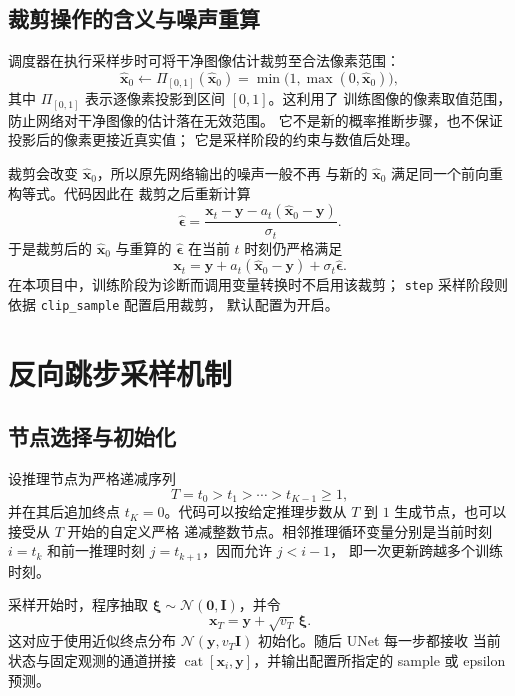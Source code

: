 \documentclass[UTF8,a4paper,12pt]{ctexart}
\begin{document}
\subsection{裁剪操作的含义与噪声重算}

调度器在执行采样步时可将干净图像估计裁剪至合法像素范围：
\[
  \widehat{\bm{x}}_0
  \leftarrow
  \Pi_{[0,1]}(\widehat{\bm{x}}_0)
  =
  \min\!\bigl(1,\max(0,\widehat{\bm{x}}_0)\bigr),
\]
其中 \(\Pi_{[0,1]}\) 表示逐像素投影到区间 \([0,1]\)。这利用了
训练图像的像素取值范围，防止网络对干净图像的估计落在无效范围。
它不是新的概率推断步骤，也不保证投影后的像素更接近真实值；
它是采样阶段的约束与数值后处理。

裁剪会改变 \(\widehat{\bm{x}}_0\)，所以原先网络输出的噪声一般不再
与新的 \(\widehat{\bm{x}}_0\) 满足同一个前向重构等式。代码因此在
裁剪之后重新计算
\[
  \widehat{\bm{\epsilon}}
  =
  \frac{
    \bm{x}_t-\bm{y}
    -a_t(\widehat{\bm{x}}_0-\bm{y})
  }{\sigma_t}.
\]
于是裁剪后的 \(\widehat{\bm{x}}_0\) 与重算的
\(\widehat{\bm{\epsilon}}\) 在当前 \(t\) 时刻仍严格满足
\[
  \bm{x}_t
  =\bm{y}
    +a_t(\widehat{\bm{x}}_0-\bm{y})
    +\sigma_t\widehat{\bm{\epsilon}}.
\]
在本项目中，训练阶段为诊断而调用变量转换时不启用该裁剪；
\texttt{step} 采样阶段则依据 \texttt{clip\_sample} 配置启用裁剪，
默认配置为开启。

\section{反向跳步采样机制}

\subsection{节点选择与初始化}

设推理节点为严格递减序列
\[
  T=t_0>t_1>\cdots>t_{K-1}\geq1,
\]
并在其后追加终点 \(t_K=0\)。代码可以按给定推理步数从
\(T\) 到 \(1\) 生成节点，也可以接受从 \(T\) 开始的自定义严格
递减整数节点。相邻推理循环变量分别是当前时刻
\(i=t_k\) 和前一推理时刻 \(j=t_{k+1}\)，因而允许 \(j<i-1\)，
即一次更新跨越多个训练时刻。

采样开始时，程序抽取
\(\bm{\xi}\sim\mathcal{N}(\bm{0},\bm{I})\)，并令
\begin{equation}
  \bm{x}_T=\bm{y}+\sqrt{v_T}\,\bm{\xi}.
  \label{eq:init}
\end{equation}
这对应于使用近似终点分布
\(\mathcal{N}(\bm{y},v_T\bm{I})\) 初始化。随后 UNet 每一步都接收
当前状态与固定观测的通道拼接
\(\operatorname{cat}[\bm{x}_i,\bm{y}]\)，并输出配置所指定的
sample 或 epsilon 预测。
\end{document}
